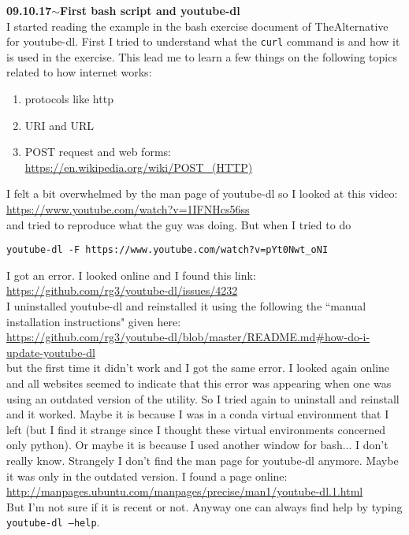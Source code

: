 \documentclass[11pt,a4paper]{article}
\newenvironment{loggentry}[2]%
{\noindent\textbf{#1}\hspace{1cm}$\mathbf{\sim}$\text{ }\textbf{#2}\\}{\vspace{0.5cm}}
\begin{document}
\begin{loggentry}{09.10.17}{First bash script and youtube-dl}
I started reading the example in the bash exercise document of TheAlternative for youtube-dl. First I tried to understand what the \texttt{curl} command is and how it is used in the exercise. This lead me to learn a few things on the following topics related to how internet works:
\begin{enumerate}
\item protocols like http
\item URI and URL
\item POST request and web forms:\\
\url{https://en.wikipedia.org/wiki/POST_(HTTP)}
\end{enumerate}
I felt a bit overwhelmed by the man page of youtube-dl so I looked at this video:\\
\url{https://www.youtube.com/watch?v=1IFNHcs56ss}\\
and tried to reproduce what the guy was doing. But when I tried to do 
\begin{verbatim}
youtube-dl -F https://www.youtube.com/watch?v=pYt0Nwt_oNI
\end{verbatim}
I got an error. I looked online and I found this link:\\
\url{https://github.com/rg3/youtube-dl/issues/4232}\\
I uninstalled youtube-dl and reinstalled it using the following the ``manual installation instructions" given here:\\
\url{https://github.com/rg3/youtube-dl/blob/master/README.md#how-do-i-update-youtube-dl}\\
but the first time it didn't work and I got the same error. I looked again online and all websites seemed to indicate that this error was appearing when one was using an outdated version of the utility. So I tried again to uninstall and reinstall and it worked. Maybe it is because I was in a conda virtual environment that I left (but I find it strange since I thought these virtual environments concerned only python). Or maybe it is because I used another window for bash... I don't really know. Strangely I don't find the man page for youtube-dl anymore. Maybe it was only in the outdated version. I found a page online:\\
\url{http://manpages.ubuntu.com/manpages/precise/man1/youtube-dl.1.html}\\
But I'm not sure if it is recent or not. Anyway one can always find help by typing \texttt{youtube-dl --help}.\\

\end{loggentry}
\end{document}
